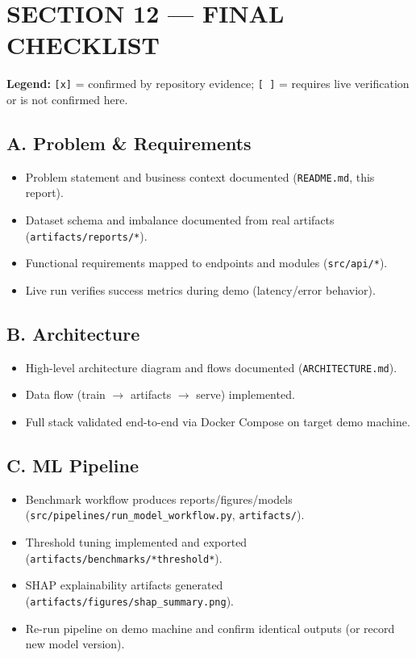 \documentclass[11pt]{article}
\newcommand{\code}[1]{\texttt{#1}}
\newcommand{\checked}{\texttt{[x]}}
\newcommand{\unchecked}{\texttt{[ ]}}
\begin{document}
\section*{SECTION 12 — FINAL CHECKLIST}

\textbf{Legend:} \checked{} = confirmed by repository evidence; \unchecked{} = requires live verification or is not confirmed here.

\subsection*{A. Problem \& Requirements}
\begin{itemize}
  \item[\checked] Problem statement and business context documented (\code{README.md}, this report).
  \item[\checked] Dataset schema and imbalance documented from real artifacts (\code{artifacts/reports/*}).
  \item[\checked] Functional requirements mapped to endpoints and modules (\code{src/api/*}).
  \item[\unchecked] Live run verifies success metrics during demo (latency/error behavior).
\end{itemize}

\subsection*{B. Architecture}
\begin{itemize}
  \item[\checked] High-level architecture diagram and flows documented (\code{ARCHITECTURE.md}).
  \item[\checked] Data flow (train \(\rightarrow\) artifacts \(\rightarrow\) serve) implemented.
  \item[\unchecked] Full stack validated end-to-end via Docker Compose on target demo machine.
\end{itemize}

\subsection*{C. ML Pipeline}
\begin{itemize}
  \item[\checked] Benchmark workflow produces reports/figures/models (\code{src/pipelines/run\_model\_workflow.py}, \code{artifacts/}).
  \item[\checked] Threshold tuning implemented and exported (\code{artifacts/benchmarks/*threshold*}).
  \item[\checked] SHAP explainability artifacts generated (\code{artifacts/figures/shap\_summary.png}).
  \item[\unchecked] Re-run pipeline on demo machine and confirm identical outputs (or record new model version).
\end{itemize}
\end{document}
